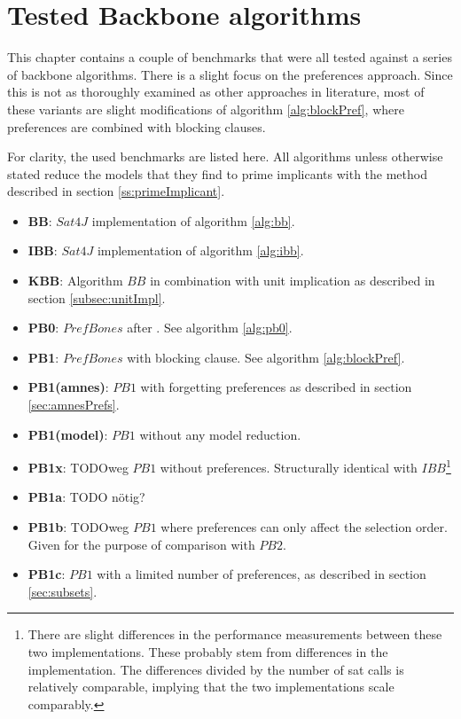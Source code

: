 \section{Tested Backbone algorithms}

This chapter contains a couple of benchmarks that were all tested against a series of backbone algorithms. There is a slight focus on the preferences approach. Since this is not as thoroughly examined as other approaches in literature, most of these variants are slight modifications of algorithm \ref{alg:blockPref}, where preferences are combined with blocking clauses.

For clarity, the used benchmarks are listed here. All algorithms unless otherwise stated reduce the models that they find to prime implicants with the method described in section \ref{ss:primeImplicant}.
\begin{itemize}
\item \textbf{BB}: $Sat4J$ implementation of algorithm \ref{alg:bb}.
\item \textbf{IBB}: $Sat4J$ implementation of algorithm \ref{alg:ibb}.
\item \textbf{KBB}: Algorithm $BB$ in combination with unit implication as described in section \ref{subsec:unitImpl}. 
\item \textbf{PB0}: $PrefBones$ after \cite{PJ18}. See algorithm \ref{alg:pb0}.
\item \textbf{PB1}: $PrefBones$ with blocking clause. See algorithm \ref{alg:blockPref}.
\item \textbf{PB1(amnes)}: $PB1$ with forgetting preferences as described in section \ref{sec:amnesPrefs}.
\item \textbf{PB1(model)}: $PB1$ without any model reduction.
\item \textbf{PB1x}: TODOweg $PB1$ without preferences. Structurally identical with $IBB$\footnote{There are slight differences in the performance measurements between these two implementations. These probably stem from differences in the implementation. The differences divided by the number of sat calls is relatively comparable, implying that the two implementations scale comparably.}
\item \textbf{PB1a}: TODO nötig?
\item \textbf{PB1b}: TODOweg $PB1$ where preferences can only affect the selection order. Given for the purpose of comparison with $PB2$.
\item \textbf{PB1c}: $PB1$ with a limited number of preferences, as described in section \ref{sec:subsets}.

\end{itemize}
